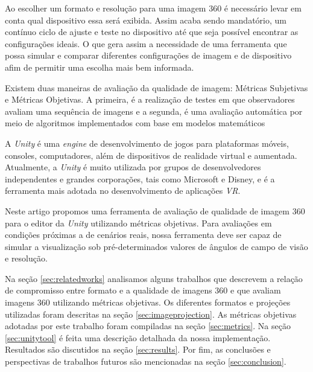 \documentclass[conference]{IEEEtran}
\begin{document}


Ao escolher um formato e resolução para uma imagem 360 é necessário levar em conta qual dispositivo essa será exibida. Assim acaba sendo mandatório, um contínuo ciclo de ajuste e teste no dispositivo até que seja possível encontrar as configurações ideais. O que gera assim a necessidade de uma ferramenta que possa simular e comparar diferentes configurações de imagem e de dispositivo afim de permitir uma escolha mais bem informada.

Existem duas maneiras de avaliação da qualidade de imagem: Métricas Subjetivas e Métricas Objetivas. A primeira, é a realização de testes em que observadores avaliam uma sequência de imagens e a segunda, é uma avaliação automática por meio de algoritmos implementados com base em modelos matemáticos

A \textit{Unity} é uma \textit{engine} de desenvolvimento de jogos para plataformas móveis, consoles, computadores, além de dispositivos de realidade virtual e aumentada. Atualmente, a \textit{Unity} é muito utilizada por grupos de desenvolvedores independentes e grandes corporações, tais como Microsoft e Disney, e é a ferramenta mais adotada no desenvolvimento de aplicações \textit{VR}.

Neste artigo propomos uma ferramenta de avaliação de qualidade de imagem 360 para o editor da \textit{Unity} utilizando métricas objetivas. Para avaliações em condições próximas a de cenários reais, nossa ferramenta deve ser capaz de simular a visualização sob pré-determinados valores de ângulos de campo de visão e resolução.

Na seção \ref{sec:relatedworks} analisamos alguns trabalhos que descrevem a relação de compromisso entre formato e a qualidade de imagens 360 e que avaliam imagens 360 utilizando métricas objetivas. Os diferentes formatos e projeções utilizadas foram descritas na seção \ref{sec:imageprojection}. As métricas objetivas adotadas por este trabalho foram compiladas na seção \ref{sec:metrics}. Na seção \ref{sec:unitytool} é feita uma descrição detalhada da nossa implementação. Resultados são discutidos na seção \ref{sec:results}. Por fim, as conclusões e perspectivas de trabalhos futuros são mencionadas na seção \ref{sec:conclusion}.
\end{document}
